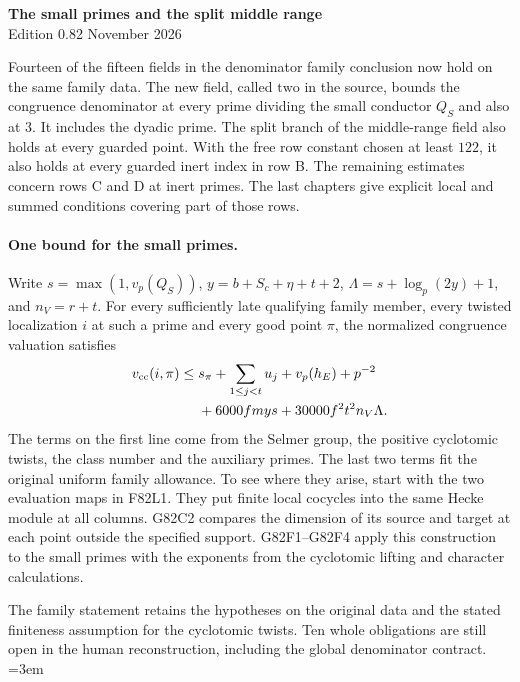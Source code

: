 \begin{center}
{\Large\bfseries The small primes and the split middle range}\\[4pt]
Edition 0.82  November 2026
\end{center}

Fourteen of the fifteen fields in the denominator family conclusion
now hold on the same family data. The new field, called
$\mathrm{two}$ in the source, bounds the congruence denominator at
every prime dividing the small conductor $Q_S$ and also at $3$.
It includes the dyadic prime. The split branch of the middle-range
field also holds at every guarded point. With the free row constant chosen at least $122$, it also holds
at every guarded inert index in row B. The remaining estimates
concern rows C and D at inert primes. The last chapters give
explicit local and summed conditions covering part of those rows.

\paragraph*{One bound for the small primes.}
Write $s=\max(1,v_p(Q_S))$, $y=b+S_c+\eta+t+2$,
$\Lambda=s+\log_p(2y)+1$, and $n_V=r+t$.
For every sufficiently late qualifying family member, every twisted
localization $i$ at such a prime and every good point $\pi$, the
normalized congruence valuation satisfies
\[
\begin{aligned}
 v_{\rm cc}(i,\pi)\le {}&
  s_\pi+\sum_{1\le j<t}u_j+v_p(h_E)+p^{-2}\\
 &{}+6000 f m y s+30000 f^2t^2 n_V\Lambda .
\end{aligned}
\]
The terms on the first line come from the Selmer group, the positive
cyclotomic twists, the class number and the auxiliary primes. The
last two terms fit the original uniform family allowance. To see
where they arise, start with the two evaluation maps in F82L1.
They put finite local cocycles into the same Hecke module at all
columns. G82C2 compares the dimension of its source and target at
each point outside the specified support. G82F1--G82F4 apply this
construction to the small primes with the exponents from the
cyclotomic lifting and character calculations.

The family statement retains the hypotheses on the original data
and the stated finiteness assumption for the cyclotomic twists.
Ten whole obligations are still open in the human reconstruction,
including the global denominator contract.
\begingroup\emergencystretch=3em



















\endgroup
